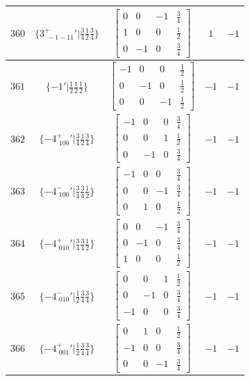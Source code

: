 \documentclass[fleqn,8pt]{jsarticle}
\begin{document}
\begin{longtable}{ccccc}
$ 360 $ & $ \{3^{+}_{\,\,-1-11}{}'|\frac{3}{4} \frac{1}{2} \frac{3}{4}\} $ & $ \begin{bmatrix} 0 & 0 & -1 & \frac{3}{4} \\ 1 & 0 & 0 & \frac{1}{2} \\ 0 & -1 & 0 & \frac{3}{4} \end{bmatrix} $ & $ 1 $ & $ -1 $ \\ \hline
$ 361 $ & $ \{-1{}'|\frac{1}{2} \frac{1}{2} \frac{1}{2}\} $ & $ \begin{bmatrix} -1 & 0 & 0 & \frac{1}{2} \\ 0 & -1 & 0 & \frac{1}{2} \\ 0 & 0 & -1 & \frac{1}{2} \end{bmatrix} $ & $ -1 $ & $ -1 $ \\ \hline
$ 362 $ & $ \{-4^{+}_{\,\,100}{}'|\frac{3}{4} \frac{1}{2} \frac{3}{4}\} $ & $ \begin{bmatrix} -1 & 0 & 0 & \frac{3}{4} \\ 0 & 0 & 1 & \frac{1}{2} \\ 0 & -1 & 0 & \frac{3}{4} \end{bmatrix} $ & $ -1 $ & $ -1 $ \\ \hline
$ 363 $ & $ \{-4^{-}_{\,\,100}{}'|\frac{3}{4} \frac{3}{4} \frac{1}{2}\} $ & $ \begin{bmatrix} -1 & 0 & 0 & \frac{3}{4} \\ 0 & 0 & -1 & \frac{3}{4} \\ 0 & 1 & 0 & \frac{1}{2} \end{bmatrix} $ & $ -1 $ & $ -1 $ \\ \hline
$ 364 $ & $ \{-4^{+}_{\,\,010}{}'|\frac{3}{4} \frac{3}{4} \frac{1}{2}\} $ & $ \begin{bmatrix} 0 & 0 & -1 & \frac{3}{4} \\ 0 & -1 & 0 & \frac{3}{4} \\ 1 & 0 & 0 & \frac{1}{2} \end{bmatrix} $ & $ -1 $ & $ -1 $ \\ \hline
$ 365 $ & $ \{-4^{-}_{\,\,010}{}'|\frac{1}{2} \frac{3}{4} \frac{3}{4}\} $ & $ \begin{bmatrix} 0 & 0 & 1 & \frac{1}{2} \\ 0 & -1 & 0 & \frac{3}{4} \\ -1 & 0 & 0 & \frac{3}{4} \end{bmatrix} $ & $ -1 $ & $ -1 $ \\ \hline
$ 366 $ & $ \{-4^{+}_{\,\,001}{}'|\frac{1}{2} \frac{3}{4} \frac{3}{4}\} $ & $ \begin{bmatrix} 0 & 1 & 0 & \frac{1}{2} \\ -1 & 0 & 0 & \frac{3}{4} \\ 0 & 0 & -1 & \frac{3}{4} \end{bmatrix} $ & $ -1 $ & $ -1 $ \\ \hline

\end{longtable}
\end{document}
